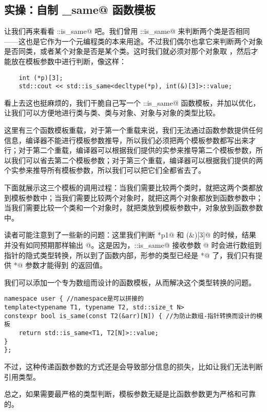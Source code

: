\subsection*{实操：自制 \lstinline@is_same@ 函数模板}
让我们再来看看 \lstinline@std::is_same@ 吧。我们曾用 \lstinline@std::is_same@ 来判断两个类是否相同——这也是它作为一个元编程类的本来用途。不过我们偶尔也拿它来判断两个对象是否同类，或者某个对象是否是某个类。这时我们就必须对那个对象取 \lstinline@decltype@，然后才能放在模板参数中进行判断，像这样：
\begin{lstlisting}
    int (*p)[3];
    std::cout << std::is_same<decltype(*p), int(&)[3]>::value;
\end{lstlisting}\par
看上去这也挺麻烦的，我们干脆自己写一个 \lstinline@user::is_same@ 函数模板，并加以优化，让我们可以方便地进行类与类、类与对象、对象与对象的类型比较。

这里有三个函数模板重载，对于第一个重载来说，我们无法通过函数参数提供任何信息，编译器不能进行模板参数推导，所以我们必须把两个模板参数都写出来才行；对于第二个重载，编译器可以根据我们提供的实参来推导第二个模板参数，所以我们可以省去第二个模板参数；对于第三个重载，编译器可以根据我们提供的两个实参来推导所有模板参数，所以我们可以把它们全都省去了。\par
下面就展示这三个模板的调用过程：当我们需要比较两个类时，就把这两个类都放到模板参数中；当我们需要比较两个对象时，就把这两个对象都放到函数参数中；当我们需要比较一个类和一个对象时，就把类放到模板参数中，对象放到函数参数中。\par

读者可能注意到了一些新的问题：这里我们判断 \lstinline@*p1@ 和 \lstinline@int(&)[3]@ 的时候，结果并没有如同预期那样输出 @。这是因为，\lstinline@user::is_same@ 接收参数 @ 时会进行数组到指针的隐式类型转换，所以到了函数内部，\lstinline@obj@ 形参的类型已经是 \lstinline@int*@ 了，我们只有提供 \lstinline@int*@ 参数才能得到 \lstinline@true@ 的返回值。\par
我们可以添加一个专为数组而设计的函数模板，从而解决这个类型转换的问题。
\begin{lstlisting}
namespace user { //namespace是可以拼接的
template<typename T1, typename T2, std::size_t N>
constexpr bool is_same(const T2(&arr)[N]) { //为防止数组-指针转换而设计的模板
    return std::is_same<T1, T2[N]>::value;
}
};
\end{lstlisting}
不过，这种传递函数参数的方式还是会导致部分信息的损失，比如让我们无法判断引用类型。\par
总之，如果需要最严格的类型判断，模板参数无疑是比函数参数更为严格和可靠的。\par
